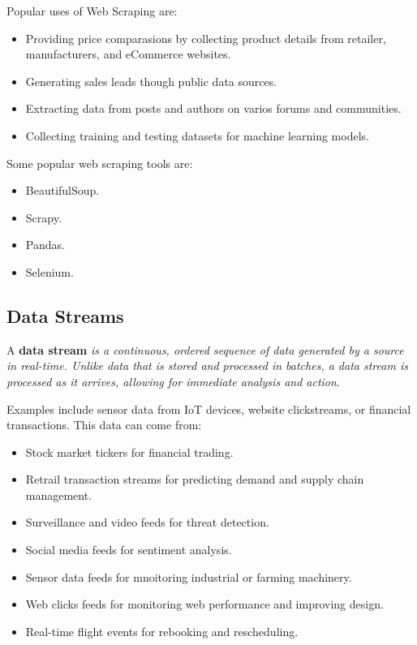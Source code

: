 \documentclass[../../ibm_data_analysis.tex]{subfiles}
\begin{document}
    \begin{exa}
        Popular uses of Web Scraping are:
        \begin{itemize}
            \item Providing price comparasions by collecting product details from retailer, manufacturers, and eCommerce websites.
            \item Generating sales leads though public data sources.
            \item Extracting data from posts and authors on varios forums and communities.
            \item Collecting training and testing datasets for machine learning models.
        \end{itemize}
    \end{exa}

    \begin{obs}
        Some popular web scraping tools are:
        \begin{itemize}
            \item BeautifulSoup.
            \item Scrapy.
            \item Pandas.
            \item Selenium.
        \end{itemize}
    \end{obs}

    \subsection{Data Streams}

    \begin{mydef}
        A \textbf{data stream} \textit{is a continuous, ordered sequence of data generated by a source in real-time. Unlike data that is stored and processed in batches, a data stream is processed as it arrives, allowing for immediate analysis and action}.
    \end{mydef}

    Examples include sensor data from IoT devices, website clickstreams, or financial transactions. This data can come from:
    \begin{itemize}
        \item Stock market tickers for financial trading.
        \item Retrail transaction streams for predicting demand and supply chain management.
        \item Surveillance and video feeds for threat detection.
        \item Social media feeds for sentiment analysis.
        \item Sensor data feeds for mnoitoring industrial or farming machinery.
        \item Web clicks feeds for monitoring web performance and improving design.
        \item Real-time flight events for rebooking and rescheduling.
    \end{itemize}
\end{document}
